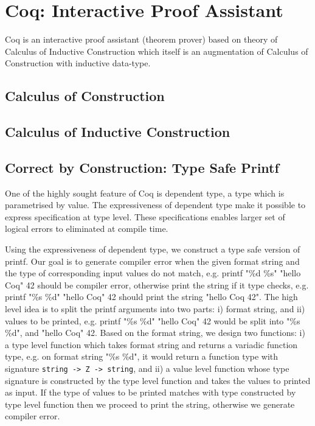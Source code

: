 \section{Coq: Interactive Proof Assistant}
\label{sec:problemstatement}
Coq  is an interactive proof assistant (theorem prover) based on
theory of Calculus of 
Inductive Construction \citep{Paulin-Mohring:1993:IDS:645891.671440} which itself is an 
augmentation of Calculus of Construction 
\citep{Coquand:1988:CC:47724.47725} with inductive data-type.  
 

\subsection{Calculus of Construction}
\label{sec:cc}
\subsection{Calculus of Inductive Construction}
\label{sec:cic}
 
 

    
 \subsection{Correct by Construction: Type Safe Printf}
 \label{sec:deplambda}
  One of the highly sought feature of Coq is dependent type, 
  a type which is parametrised by value.  
  The expressiveness of dependent type make it possible
  to express specification at type level. These specifications enables larger 
  set of  logical errors to eliminated at compile time. 
  
 
 Using the expressiveness of dependent type, we construct a type safe version of 
 printf. Our goal is to generate compiler error when the given format string and the type of 
 corresponding input values  
 do not match, e.g. printf "\%d \%s" "hello Coq" 42 should be compiler error, otherwise
 print the string if it type checks, e.g.
 printf "\%s \%d" "hello Coq" 42 should print the string "hello Coq  42".
 The high level idea is to split the printf arguments into two parts: i) format string, 
 and ii) values to be printed, e.g. printf "\%s \%d" "hello Coq" 42 would be split into "\%s \%d", and 
 "hello Coq" 42.  Based on the format string, we design two functions: i) a type level function 
 which takes format string and returns a variadic function type, e.g. 
 on format string "\%s \%d", it would return a function type with 
 signature \texttt{string -> Z  -> string}, and ii) a value level function whose type signature 
 is constructed by the type level function and takes the values to printed as input. If the 
 type of values to be printed matches with type constructed by type level function then 
 we proceed to print the string, otherwise we generate compiler error.  
 


